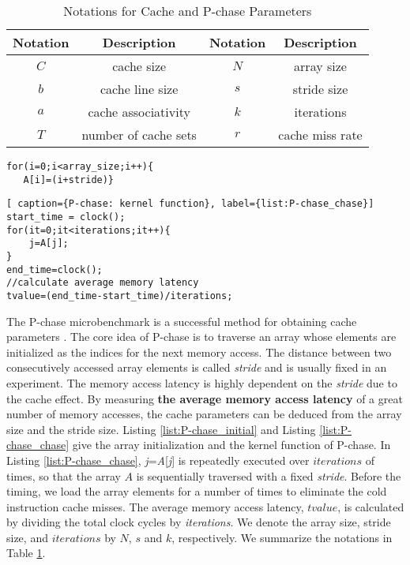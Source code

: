 \documentclass[10pt,journal,compsoc]{IEEEtran}
\theoremstyle{definition}
\begin{document}
\begin{table}\centering
\caption{Notations for Cache and P-chase Parameters}
\label{tab:notation}
    \begin{tabular}{|c|c ||c|c |}
    \hline
    Notation & Description & Notation & Description\\
    \hline
    $C$ & cache size & $N$ & array size \\
    $b$ & cache line size & $s$ & stride size \\
    $a$ & cache associativity & $k$ & iterations \\
    $T$ & number of cache sets & $r$ & cache miss rate \\
    \hline
    \end{tabular}
\end{table}

\renewcommand{\thelstlisting}{\arabic{lstlisting}}
\begin{lstlisting}[caption={P-chase: array initialization}, label={list:P-chase_initial}]
for(i=0;i<array_size;i++){
   A[i]=(i+stride)}
\end{lstlisting}

\renewcommand{\thelstlisting}{\arabic{lstlisting}}
\begin{lstlisting}[ caption={P-chase: kernel function}, label={list:P-chase_chase}]
start_time = clock();
for(it=0;it<iterations;it++){
    j=A[j];
}
end_time=clock();
//calculate average memory latency
tvalue=(end_time-start_time)/iterations;
\end{lstlisting}

The P-chase microbenchmark is a successful method for obtaining cache parameters \cite{saavedra1992cpu,saavedra1995measuring,mcvoy1996lmbench,volkov2008benchmarking,
papadopoulou2009micro,wong2010demystifying,baghsorkhi2012efficient,meltzer2013micro}. The core idea of P-chase is to traverse an array whose elements are initialized as the indices for the next memory access. The distance between two consecutively accessed array elements is called \emph{stride} and is usually fixed in an experiment. The memory access latency is highly dependent on the \emph{stride} due to the cache effect. By measuring \textbf{the average memory access latency} of a great number of memory accesses, the cache parameters can be deduced from the array size and the stride size. Listing \ref{list:P-chase_initial} and Listing \ref{list:P-chase_chase} give the array initialization and the kernel function of P-chase. In Listing \ref{list:P-chase_chase}, \emph{j}=\emph{A}[\emph{j}] is repeatedly executed over $iterations$ of times, so that the array $A$ is sequentially traversed with a fixed \emph{stride}. Before the timing, we load the array elements for a number of times to eliminate the cold instruction cache misses. The average memory access latency, $tvalue$, is calculated by dividing the total clock cycles by \emph{iterations}. We denote the array size, stride size, and $iterations$ by $N$, $s$ and $k$, respectively. We summarize the notations in Table \ref{tab:notation}.
\end{document}
